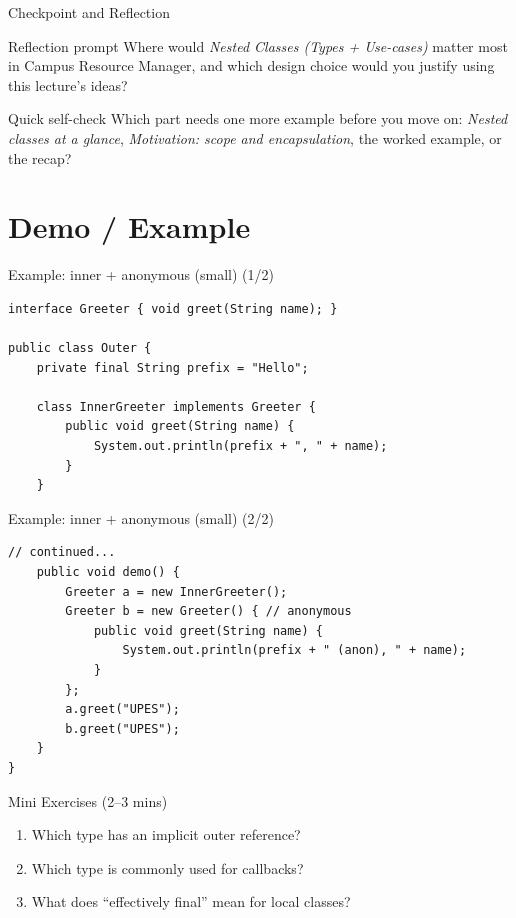 \documentclass{beamer}
\begin{document}
\begin{frame}{Checkpoint and Reflection}
\begin{block}{Reflection prompt}
Where would \textit{Nested Classes (Types + Use-cases)} matter most in Campus Resource Manager, and which design choice would you justify using this lecture's ideas?
\end{block}
\begin{block}{Quick self-check}
Which part needs one more example before you move on: \textit{Nested classes at a glance}, \textit{Motivation: scope and encapsulation}, the worked example, or the recap?
\end{block}
  \slidesources{\OOPSUnitIIISources}
\end{frame}

\section{Demo / Example}
\label{sec:demo}

\begin{frame}[fragile]{Example: inner + anonymous (small) (1/2)}
\begin{lstlisting}
interface Greeter { void greet(String name); }

public class Outer {
    private final String prefix = "Hello";

    class InnerGreeter implements Greeter {
        public void greet(String name) {
            System.out.println(prefix + ", " + name);
        }
    }
\end{lstlisting}
  \slidesources{\OOPSUnitIIISources}
\end{frame}

\begin{frame}[fragile]{Example: inner + anonymous (small) (2/2)}
\begin{lstlisting}
// continued...
    public void demo() {
        Greeter a = new InnerGreeter();
        Greeter b = new Greeter() { // anonymous
            public void greet(String name) {
                System.out.println(prefix + " (anon), " + name);
            }
        };
        a.greet("UPES");
        b.greet("UPES");
    }
}
\end{lstlisting}
  \slidesources{\OOPSUnitIIISources}
\end{frame}

\begin{frame}{Mini Exercises (2--3 mins)}
  \begin{enumerate}[<+->]
    \item Which type has an implicit outer reference?
    \item Which type is commonly used for callbacks?
    \item What does ``effectively final'' mean for local classes?
  \end{enumerate}
  \slidesources{\OOPSUnitIIISources}
\end{frame}
\end{document}
